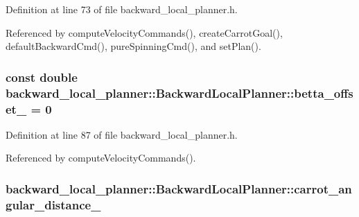 Definition at line 73 of file backward\+\_\+local\+\_\+planner.\+h.



Referenced by compute\+Velocity\+Commands(), create\+Carrot\+Goal(), default\+Backward\+Cmd(), pure\+Spinning\+Cmd(), and set\+Plan().

\subsubsection[{\texorpdfstring{betta\+\_\+offset\+\_\+}{betta_offset_}}]{\setlength{\rightskip}{0pt plus 5cm}const double backward\+\_\+local\+\_\+planner\+::\+Backward\+Local\+Planner\+::betta\+\_\+offset\+\_\+ = 0\hspace{0.3cm}{\ttfamily [private]}}\hypertarget{classbackward__local__planner_1_1BackwardLocalPlanner_a3eeb4150cba2ff54d177b9a51c6c17cb}{}\label{classbackward__local__planner_1_1BackwardLocalPlanner_a3eeb4150cba2ff54d177b9a51c6c17cb}


Definition at line 87 of file backward\+\_\+local\+\_\+planner.\+h.



Referenced by compute\+Velocity\+Commands().

\subsubsection[{\texorpdfstring{carrot\+\_\+angular\+\_\+distance\+\_\+}{carrot_angular_distance_}}]{ backward\+\_\+local\+\_\+planner\+::\+Backward\+Local\+Planner\+::carrot\+\_\+angular\+\_\+distance\+\_\+\hspace{0.3cm}{\ttfamily [private]}}\hypertarget{classbackward__local__planner_1_1BackwardLocalPlanner_adcfcc43316a79db09f6c09b8e2a482b6}{}\label{classbackward__local__planner_1_1BackwardLocalPlanner_adcfcc43316a79db09f6c09b8e2a482b6}


